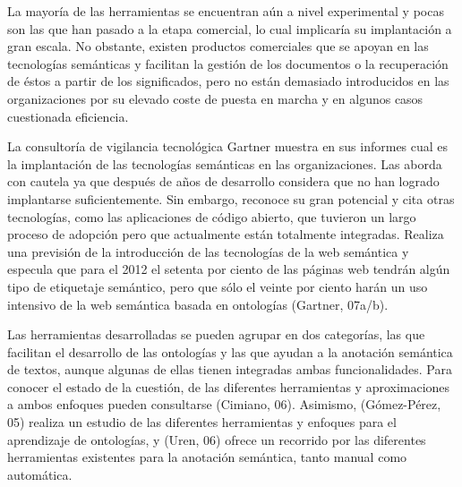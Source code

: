 La mayoría de las herramientas se encuentran aún a nivel experimental y pocas son las que han pasado a la etapa comercial, lo cual implicaría su implantación a gran escala. No obstante, existen productos comerciales que se apoyan en las tecnologías semánticas y facilitan la gestión de los documentos o la recuperación de éstos a partir de los significados, pero no están demasiado introducidos en las organizaciones por su elevado coste de puesta en marcha y en algunos casos cuestionada eficiencia.

La consultoría de vigilancia tecnológica Gartner muestra en sus informes cual es la implantación de las tecnologías semánticas en las organizaciones. Las aborda con cautela ya que después de años de desarrollo considera que no han logrado implantarse suficientemente. Sin embargo, reconoce su gran potencial y cita otras tecnologías, como las aplicaciones de código abierto, que tuvieron un largo proceso de adopción pero que actualmente están totalmente integradas. Realiza una previsión de la introducción de las tecnologías de la web semántica y especula que para el 2012 el setenta por ciento de las páginas web tendrán algún tipo de etiquetaje semántico, pero que sólo el veinte por ciento harán un uso intensivo de la web semántica basada en ontologías (Gartner, 07a/b).

Las herramientas desarrolladas se pueden agrupar en dos categorías, las que facilitan el desarrollo de las ontologías y las que ayudan a la anotación semántica de textos, aunque algunas de ellas tienen integradas ambas funcionalidades. Para conocer el estado de la cuestión, de las diferentes herramientas y aproximaciones a ambos enfoques pueden consultarse (Cimiano, 06). Asimismo, (Gómez-Pérez, 05) realiza un estudio de las diferentes herramientas y enfoques para el aprendizaje de ontologías, y (Uren, 06) ofrece un recorrido por las diferentes herramientas existentes para la anotación semántica, tanto manual como automática.


